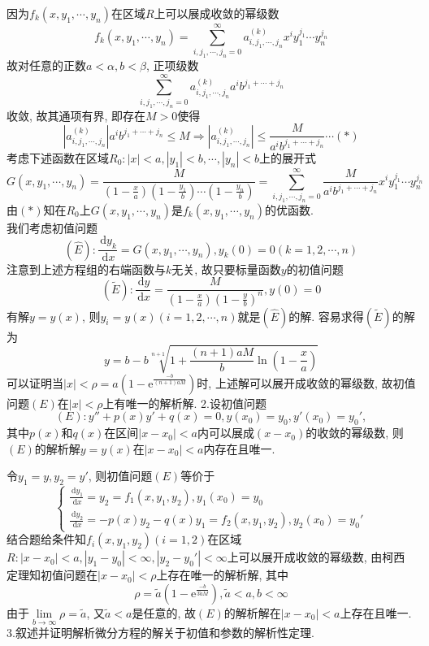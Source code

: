 \documentclass[titlepage,11pt,a4paper,twoside]{report}
\makeatletter
\newcommand\diff{\,\mathrm{d}}
\newcommand\e{\mathrm{e}}
\renewenvironment{proof}{\par
	\pushQED{\qed}%
	\normalfont \topsep1\p@\@plus6\p@\relax
	\trivlist
	\item\relax
	{\hspace*{\parindent}{\heiti 证明}\@addpunct{:}}\hspace\labelsep\ignorespaces
}{%
	\popQED\endtrivlist\@endpefalse
}
\newenvironment{solve}{\par
	\pushQED{\qed}%
	\normalfont \topsep1\p@\@plus6\p@\relax
	\trivlist
	\item\relax
	{\hspace*{\parindent}{\heiti 解}\@addpunct{:}}\hspace\labelsep\ignorespaces
}{%
	\popQED\endtrivlist\@endpefalse
}
\makeatother
\begin{document}
\begin{proof}
因为$f_k(x,y_1,\cdots,y_n)$在区域$R$上可以展成收敛的幂级数
\[f_k(x,y_1,\cdots,y_n)=\sum_{i,j_1,\cdots,j_n=0}^{\infty}a_{i,j_1,\cdots,j_n}^{(k)}x^iy_1^{j_1}\cdots y_n^{j_n}\]
故对任意的正数$a<\alpha,b<\beta$, 正项级数
\[\sum_{i,j_1,\cdots,j_n=0}^{\infty}a_{i,j_1,\cdots,j_n}^{(k)}a^ib^{j_1+\cdots+j_n}\]
收敛, 故其通项有界, 即存在$M>0$使得
\[\left|a_{i,j_1,\cdots,j_n}^{(k)}\right|a^ib^{j_1+\cdots+j_n}\leq M\Rightarrow\left|a_{i,j_1,\cdots,j_n}^{(k)}\right|\leq\frac{M}{a^ib^{j_1+\cdots+j_n}}\cdots(*)\]
考虑下述函数在区域$R_0:|x|<a,|y_1|<b,\cdots,|y_n|<b$上的展开式
\[G(x,y_1,\cdots,y_n)=\frac{M}{\left(1-\frac{x}{a}\right)\left(1-\frac{y_1}{b}\right)\cdots\left(1-\frac{y_n}{b}\right)}=\sum_{i,j_1,\cdots,j_n=0}^{\infty}\frac{M}{a^ib^{j_1+\cdots+j_n}}x^iy_1^{j_1}\cdots y_n^{j_n}\]
由$(*)$知在$R_0$上$G(x,y_1,\cdots,y_n)$是$f_k(x,y_1,\cdots,y_n)$的优函数.\\
我们考虑初值问题
\[(\widehat{E}):\frac{\diff y_k}{\diff x}=G(x,y_1,\cdots,y_n),y_k(0)=0(k=1,2,\cdots,n)\]
注意到上述方程组的右端函数与$k$无关, 故只要标量函数$y$的初值问题
\[(\widetilde{E}):\frac{\diff y}{\diff x}=\frac{M}{\left(1-\frac{x}{a}\right)\left(1-\frac{y}{b}\right)^n},y(0)=0\]
有解$y=y(x)$, 则$y_i=y(x)(i=1,2,\cdots,n)$就是$(\widehat{E})$的解. 容易求得$(\widetilde{E})$的解为
\[y=b-b\sqrt[n+1]{1+\frac{(n+1)aM}{b}\ln\left(1-\frac{x}{a}\right)}\]
可以证明当$\displaystyle|x|<\rho=a\left(1-\e^{\frac{-b}{(n+1)aM}}\right)$时, 上述解可以展开成收敛的幂级数, 故初值问题$(E)$在$|x|<\rho$上有唯一的解析解.
\end{proof}
2.设初值问题\[(E):y''+p(x)y'+q(x)=0,y(x_0)=y_0,y'(x_0)=y_0',\]
其中$p(x)$和$q(x)$在区间$|x-x_0|<a$内可以展成$(x-x_0)$的收敛的幂级数, 则$(E)$的解析解$y=y(x)$在$|x-x_0|<a$内存在且唯一.
\begin{solve} 
令$y_1=y,y_2=y'$, 则初值问题$(E)$等价于
\[\begin{cases}
\frac{\diff y_1}{\diff x}=y_2=f_1(x,y_1,y_2),y_1(x_0)=y_0\\
\frac{\diff y_2}{\diff x}=-p(x)y_2-q(x)y_1=f_2(x,y_1,y_2),y_2(x_0)=y_0'
\end{cases}\]
结合题给条件知$f_i(x,y_1,y_2)(i=1,2)$在区域$R:|x-x_0|<a,|y_1-y_0|<\infty,|y_2-y_0'|<\infty$上可以展开成收敛的幂级数, 由柯西定理知初值问题在$|x-x_0|<\rho$上存在唯一的解析解, 其中
\[\rho=\tilde{a}\left(1-\e^{\frac{-b}{3\tilde{a}M}}\right),\tilde{a}<a,b<\infty\]
由于$\lim\limits_{b\to\infty}\rho=\tilde{a}$, 又$\tilde{a}<a$是任意的, 故$(E)$的解析解在$|x-x_0|<a$上存在且唯一.
\end{solve}
3.叙述并证明解析微分方程的解关于初值和参数的解析性定理.
\end{document}
